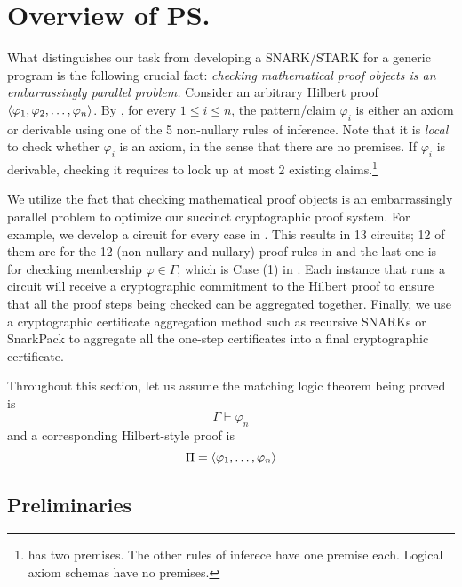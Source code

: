 \documentclass{article}
\begin{document}
\section{Overview of \ps}

What distinguishes our task from developing a SNARK/STARK for a generic program
is the following crucial fact:
\emph{checking mathematical proof objects is an embarrassingly parallel problem.} 
Consider an arbitrary Hilbert proof
$\left\langle \varphi_1,\varphi_2,\dots,\varphi_n \right\rangle$. 
By , for every $1 \le i \le n$,
the pattern/claim $\varphi_i$
is either an axiom or derivable using one of the 5 non-nullary rules of inference.
Note that it is \emph{local} to check whether $\varphi_i$ is an axiom,
in the sense that there are no premises. 
If $\varphi_i$ is derivable, checking it requires to look up at most 2 existing claims.\footnote{\pruleMP has two premises. The other rules of inferece have one premise each. Logical axiom schemas have no premises. } 

We utilize the fact that
checking mathematical proof objects is an embarrassingly parallel problem
to optimize our succinct cryptographic proof system.
For example, we develop a circuit for every case in .
This results in 13 circuits; 12 of them are for the 12 
(non-nullary and nullary) proof rules in  
and the last one is for checking membership $\varphi \in \Gamma$,
which is Case (1) in . 
Each instance that runs a circuit will receive a cryptographic commitment 
to the Hilbert proof to ensure that all the proof steps being checked
can be aggregated together. 
Finally, we use a cryptographic certificate aggregation method such as
recursive SNARKs or SnarkPack 
to aggregate all the one-step certificates into a final cryptographic certificate. 

Throughout this section, let us assume
the matching logic theorem being proved is
\begin{equation}
\label{eq:goal}
\Gamma \vdash \varphi_n
\end{equation}
and a corresponding Hilbert-style proof is
\begin{equation}
\Pi = \left\langle \varphi_1,\dots,\varphi_n \right\rangle
\end{equation}

\subsection{Preliminaries}
\end{document}
